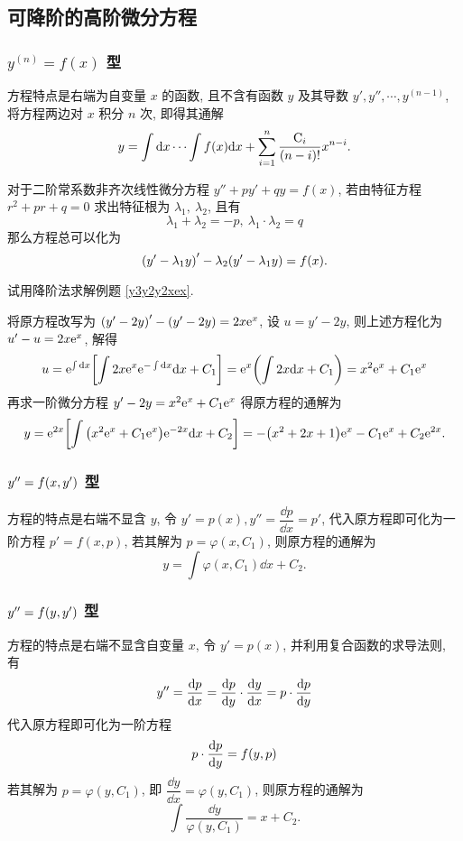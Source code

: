 \subsection{可降阶的高阶微分方程}

\subsubsection{$y^{(n)}=f(x)$ 型}

方程特点是右端为自变量 $x$ 的函数, 且不含有函数 $y$ 及其导数 $y',y'',\cdots,y^{(n-1)}$, 将方程两边对 $x$ 积分 $n$ 次, 即得其通解
$$y=\int\dd x\cdots\int f(x)\dd x+\sum_{i=1}^{n}\dfrac{\mathrm{C}_i}{(n-i)!}x^{n-i}.$$

\begin{theorem}
    对于二阶常系数非齐次线性微分方程 $y''+py'+qy=f(x)$, 若由特征方程 $r^2+pr+q=0$ 求出特征根为 $\lambda_1,~\lambda_2$, 且有
    $$\lambda_1+\lambda_2=-p,~\lambda_1\cdot\lambda_2=q$$
    那么方程总可以化为 $$\qty(y'-\lambda_1y)'-\lambda_2\qty(y'-\lambda_1y)=f(x).$$
\end{theorem}

\begin{example}
    试用降阶法求解例题 \ref{y3y2y2xex}.
\end{example}
\begin{solution}
    将原方程改写为 $\qty(y'-2y)'-(y'-2y)=2x\mathrm{e} ^x$, 设 $u=y'-2y$, 则上述方程化为 $u'-u=2x\mathrm{e} ^x$, 解得
    $$u=\mathrm{e} ^{\int\dd x}\qty[\int 2x\mathrm{e} ^x\mathrm{e} ^{-\int\dd x}\dd x+C_1]=\mathrm{e} ^x\qty(\int 2x\dd x+C_1)=x^2\mathrm{e} ^x+C_1\mathrm{e} ^x$$
    再求一阶微分方程 $y'-2y=x^2\mathrm{e} ^x+C_1\mathrm{e} ^x$ 得原方程的通解为
    $$y=\mathrm{e} ^{2x}\qty[\int\qty(x^2\mathrm{e} ^x+C_1\mathrm{e} ^x)\mathrm{e} ^{-2x}\dd x+C_2]=-\qty(x^2+2x+1)\mathrm{e} ^x-C_1\mathrm{e} ^x+C_2\mathrm{e} ^{2x}.$$
\end{solution}

\subsubsection{$y''=f\qty(x,y')$ 型}

方程的特点是右端不显含 $y$, 令 $y'=p(x), y''=\dfrac{\dd p}{\dd x}=p'$, 代入原方程即可化为一阶方程 $p'=f(x,p)$, 若其解为 $p=\varphi(x,C_1)$, 则原方程的通解为 $$y=\int\varphi(x,C_1)\dd x+C_2.$$

\subsubsection{$y''=f\qty(y,y')$ 型}

方程的特点是右端不显含自变量 $x$, 令 $y'=p(x)$, 并利用复合函数的求导法则, 有
$$y''=\dv{p}{x}=\dv{p}{y}\cdot\dv{y}{x}=p\cdot\dv{p}{y}$$
代入原方程即可化为一阶方程 $$p\cdot \dv{p}{y}=f(y,p)$$
若其解为 $p=\varphi(y,C_1)$, 即 $\dfrac{\dd y}{\dd x}=\varphi(y,C_1)$, 则原方程的通解为
$$\int \dfrac{\dd y}{\varphi(y,C_1)}=x+C_2.$$

